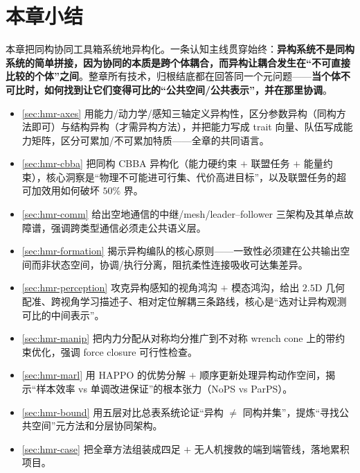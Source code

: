 \section*{本章小结}
\label{sec:hmr-summary}
本章把同构协同工具箱系统地异构化。一条认知主线贯穿始终：\textbf{异构系统不是同构系统的简单拼接，因为协同的本质是跨个体耦合，而异构让耦合发生在“不可直接比较的个体”之间}。整章所有技术，归根结底都在回答同一个元问题——\textbf{当个体不可比时，如何找到让它们变得可比的“公共空间/公共表示”，并在那里协调}。
\begin{itemize}
  \item \cref{sec:hmr-axes} 用能力/动力学/感知三轴定义异构性，区分参数异构（同构方法即可）与结构异构（才需异构方法），并把能力写成 trait 向量、队伍写成能力矩阵，区分可累加/不可累加特质——全章的共同语言。
  \item \cref{sec:hmr-cbba} 把同构 CBBA 异构化（能力硬约束 $+$ 联盟任务 $+$ 能量约束），核心洞察是“物理不可能进可行集、代价高进目标”，以及联盟任务的超可加效用如何破坏 $50\%$ 界。
  \item \cref{sec:hmr-comm} 给出空地通信的中继/mesh/leader--follower 三架构及其单点故障谱，强调跨类型通信必须走公共语义层。
  \item \cref{sec:hmr-formation} 揭示异构编队的核心原则——一致性必须建在公共输出空间而非状态空间，协调/执行分离，阻抗柔性连接吸收可达集差异。
  \item \cref{sec:hmr-perception} 攻克异构感知的视角鸿沟 $+$ 模态鸿沟，给出 $2.5\mathrm{D}$ 几何配准、跨视角学习描述子、相对定位解耦三条路线，核心是“选对让异构观测可比的中间表示”。
  \item \cref{sec:hmr-manip} 把内力分配从对称均分推广到不对称 wrench cone 上的带约束优化，强调 force closure 可行性检查。
  \item \cref{sec:hmr-marl} 用 HAPPO 的优势分解 $+$ 顺序更新处理异构动作空间，揭示“样本效率 vs 单调改进保证”的根本张力（NoPS vs ParPS）。
  \item \cref{sec:hmr-bound} 用五层对比总表系统论证“异构 $\ne$ 同构并集”，提炼“寻找公共空间”元方法和分层协同架构。
  \item \cref{sec:hmr-case} 把全章方法组装成四足 $+$ 无人机搜救的端到端管线，落地累积项目。
\end{itemize}

